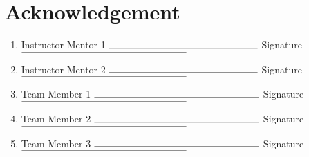 \documentclass[]{article}
\begin{document}
\section*{Acknowledgement}

\begin{enumerate}[wide,labelwidth=!,labelindent=0pt]
	\vspace{1cm}
	\item[] Instructor Mentor 1 $\rule{5.4cm}{0.15mm}$ \qquad Signature $\rule{6cm}{0.15mm}$ 
	
	\vspace{1cm}
	\item[] Instructor Mentor 2 $\rule{5.4cm}{0.15mm}$ \qquad Signature $\rule{6cm}{0.15mm}$ 
	
	
	\vspace{1cm}
	\item[] Team Member 1 $\rule{6cm}{0.15mm}$ \qquad Signature $\rule{6cm}{0.15mm}$ 
	
	\vspace{1cm}
	\item[] Team Member 2 $\rule{6cm}{0.15mm}$ \qquad Signature $\rule{6cm}{0.15mm}$ 
	
	\vspace{1cm}
	\item[] Team Member 3 $\rule{6cm}{0.15mm}$ \qquad Signature $\rule{6cm}{0.15mm}$ 
	
	
\end{enumerate}
\end{document}
